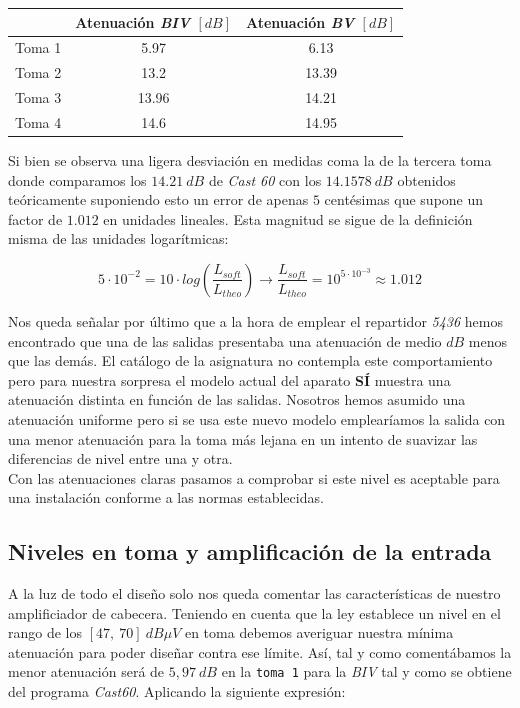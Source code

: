 \documentclass{article}[12 pt]
\begin{document}
			\begin{center}
				\begin{tabular}{| c | c | c |}
					\hline
					& Atenuación \textit{BIV} $[dB]$ & Atenuación \textit{BV} $[dB]$\\
					\hline
					Toma 1 & 5.97 & 6.13\\
					\hline
					Toma 2 & 13.2 & 13.39\\
					\hline
					Toma 3 & 13.96 & 14.21\\
					\hline
					Toma 4 & 14.6 & 14.95\\
					\hline
				\end{tabular}
			\end{center}

			Si bien se observa una ligera desviación en medidas coma la de la tercera toma donde comparamos los $14.21\ dB$ de \textit{Cast 60} con los $14.1578\ dB$ obtenidos teóricamente suponiendo esto un error de apenas $5$ centésimas que supone un factor de $1.012$ en unidades lineales. Esta magnitud se sigue de la definición misma de las unidades logarítmicas:

			$$5 \cdot 10^{-2} = 10 \cdot log(\frac{L_{soft}}{L_{theo}}) \rightarrow \frac{L_{soft}}{L_{theo}} = 10^{5 \cdot 10^{-3}} \approx 1.012$$

			Nos queda señalar por último que a la hora de emplear el repartidor \textit{5436} hemos encontrado que una de las salidas presentaba una atenuación de medio $dB$ menos que las demás. El catálogo de la asignatura no contempla este comportamiento pero para nuestra sorpresa el modelo actual del aparato \textbf{SÍ} muestra una atenuación distinta en función de las salidas. Nosotros hemos asumido una atenuación uniforme pero si se usa este nuevo modelo emplearíamos la salida con una menor atenuación para la toma más lejana en un intento de suavizar las diferencias de nivel entre una y otra.\\

			Con las atenuaciones claras pasamos a comprobar si este nivel es aceptable para una instalación conforme a las normas establecidas.

		\subsection{Niveles en toma y amplificación de la entrada}
			A la luz de todo el diseño solo nos queda comentar las características de nuestro amplificiador de cabecera. Teniendo en cuenta que la ley establece un nivel en el rango de los $[47,\ 70]\ dB\mu V$ en toma debemos averiguar nuestra mínima atenuación para poder diseñar contra ese límite. Así, tal y como comentábamos la menor atenuación será de $5,97\ dB$ en la \texttt{toma 1} para la \textit{BIV} tal y como se obtiene del programa \textit{Cast60}. Aplicando la siguiente expresión:
\end{document}
